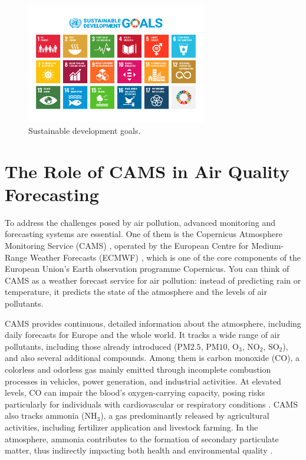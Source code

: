 \begin{figure}[h!btp]
	\centering
	\includegraphics[width=0.7\textwidth]{fig/sustainable-image.png}
	\caption[Sustainable development goals]{Sustainable development goals.\footnotemark}
	\label{fig:ej1}
\end{figure}


\section{The Role of CAMS in Air Quality Forecasting}

To address the challenges posed by air pollution, advanced monitoring and forecasting systems are essential. 
One of them is the Copernicus Atmosphere Monitoring Service (CAMS) \cite{copernicusCopernicus}, operated by the European Centre for Medium-Range Weather Forecasts (ECMWF) \cite{ecmwfECMWF}, which is one of the core components of the European Union's Earth observation programme Copernicus. 
You can think of CAMS as a weather forecast service for air pollution: instead of predicting rain or temperature, it predicts the state of the atmosphere and the levels of air pollutants.

CAMS provides continuous, detailed information about the atmosphere, including daily forecasts for Europe and the whole world. It tracks a wide range of air pollutants, including those already introduced (PM${2.5}$, PM${10}$, O$_3$, NO$_2$, SO$_2$), and also several additional compounds.
Among them is carbon monoxide (CO), a colorless and odorless gas mainly emitted through incomplete combustion processes in vehicles, power generation, and industrial activities. At elevated levels, CO can impair the blood’s oxygen-carrying capacity, posing risks particularly for individuals with cardiovascular or respiratory conditions \cite{raub2000carbon}. CAMS also tracks ammonia (NH$_3$), a gas predominantly released by agricultural activities, including fertilizer application and livestock farming. In the atmosphere, ammonia contributes to the formation of secondary particulate matter, thus indirectly impacting both health and environmental quality \cite{wyer2022ammonia}.

